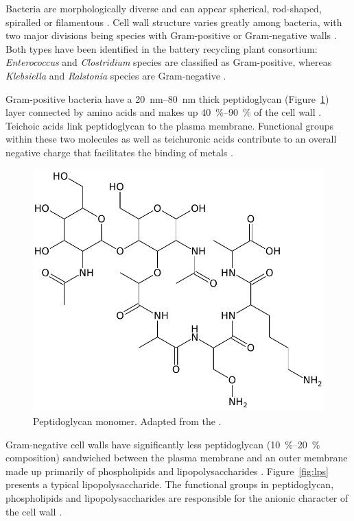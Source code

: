 Bacteria are morphologically diverse and can appear spherical, rod-shaped, spiralled or filamentous \parencite{Wang2009}. Cell wall structure varies greatly among bacteria, with two major divisions being species with Gram-positive or Gram-negative walls \parencite{Rosenberg2013}. Both types have been identified in the battery recycling plant consortium: \textit{Enterococcus} and \textit{Clostridium} species are classified as Gram-positive, whereas \textit{Klebsiella} and \textit{Ralstonia} species are Gram-negative \parencite{Horstman2019,Peens2018}.

Gram-positive bacteria have a \SIrange[range-units = single]{20}{80}{\nano\meter} thick peptidoglycan (Figure~\ref{fig:peptidoglycan}) layer connected by amino acids and makes up \SIrange[range-units = single]{40}{90}{\percent} of the cell wall \parencite{Wang2009}. Teichoic acids link peptidoglycan to the plasma membrane. Functional groups within these two molecules as well as teichuronic acids contribute to an overall negative charge that facilitates the binding of metals \parencite{Vijayaraghavan2008}.

\begin{figure}[tbph!]
	\centering
	\includegraphics[width=0.7\linewidth]{Theory/Pics/peptidoglycan}
	\caption{Peptidoglycan monomer. Adapted from the \textcite{NCBI_pep}.}
	\label{fig:peptidoglycan}
\end{figure}

Gram-negative cell walls have significantly less peptidoglycan (\SIrange[range-units = single]{10}{20}{\percent} composition)  sandwiched between the plasma membrane and an outer membrane made up primarily of phospholipids and lipopolysaccharides \parencite{Vijayaraghavan2008}. Figure~\ref{fig:lps} presents a typical lipopolysaccharide. The functional groups in peptidoglycan, phospholipids and lipopolysaccharides are responsible for the anionic character  of the cell wall \parencite{Vijayaraghavan2008}.

